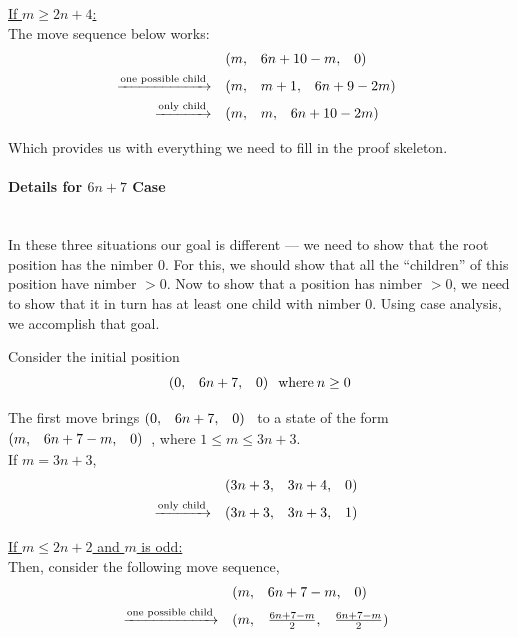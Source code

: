 \documentclass{article}
\makeatletter
\newcommand{\game}[3]{\begin{array}{@{}*6r}(#1, & #2, & #3)\end{array}}
\makeatother
\begin{document}
\bigskip
\underline{If $m \geq 2n + 4$:} \\
The move sequence below works:
\begin{align*}
  & \game{m}{6n+10-m}{0} \\
  \xrightarrow{\text{one possible child}} \quad & 
  \game{m}{m+1}{6n+9-2m} \\
  \xrightarrow{\text{only child}} \quad & 
  \game{m}{m}{6n+10-2m} \\
\end{align*}

\bigskip
Which provides us with everything we need to fill in the proof
skeleton.
\newpage

\paragraph{Details for $6n+7$ Case}\mbox{}\\
In these three situations our goal is different --- we need to show 
that the
root position has the nimber $0$. For this, we should show that all
the ``children'' of this position have nimber $> 0$. Now to show
that a position has nimber $> 0$, we need to show that it in turn has at
least one child with nimber $0$. Using case analysis, we accomplish
that goal.
\bigskip

Consider the initial position
\begin{equation*}
  \game{0}{6n+7}{0} \: \text{where} \: n \geq 0
\end{equation*}

\medskip
The first move brings $\game{0}{6n+7}{0}$ to a state of the form
$\game{m}{6n+7-m}{0}$, where $1 \leq m \leq 3n+3$. \\
If $m = 3n + 3$,
\begin{align*}
  & \game{3n+3}{3n+4}{0} \\
  \xrightarrow{\text{only child}} \quad & 
  \game{3n+3}{3n+3}{1}
\end{align*}

\bigskip
\underline{If $m \leq 2n + 2$ and $m$ is odd:} \\
Then, consider the following move sequence,
\begin{align*}
  & \game{m}{6n+7-m}{0} \\
  \xrightarrow{\text{one possible child}} \quad & 
  \game{m}{\frac{6n+7-m}{2}}{\frac{6n+7-m}{2}}
\end{align*}
\end{document}
